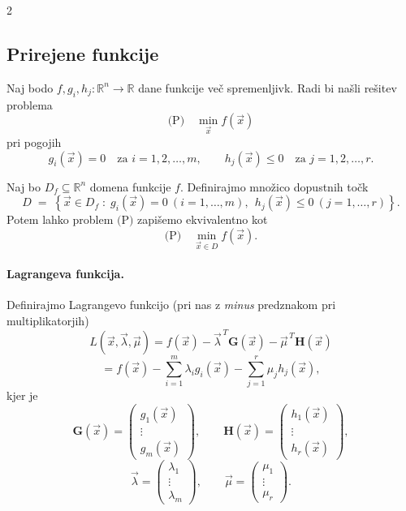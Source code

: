 \documentclass{article}
\begin{document}
\begin{multicols}{2}
	\subsection{Prirejene funkcije}

	Naj bodo \( f, g_i, h_j : \mathbb{R}^n \rightarrow \mathbb{R} \) dane funkcije več spremenljivk. Radi bi našli rešitev problema
	\[
		\text{(P)} \quad \min_{\vec{x}} f(\vec{x})
	\]
	pri pogojih
	\[
		g_i(\vec{x}) = 0 \quad \text{za } i = 1,2,\ldots,m,
		\qquad
		h_j(\vec{x}) \le 0 \quad \text{za } j = 1,2,\ldots,r.
	\]

	Naj bo \(D_f \subseteq \mathbb{R}^n\) domena funkcije \(f\). Definirajmo množico dopustnih točk
	\[
		D \;=\; \left\{\vec{x}\in D_f \;:\; g_i(\vec{x})=0 \ (i=1,\ldots,m),\ \ h_j(\vec{x})\le 0 \ (j=1,\ldots,r)\right\}.
	\]
	Potem lahko problem \(\text{(P)}\) zapišemo ekvivalentno kot
	\[
		\text{(P)} \quad \min_{\vec{x} \in D} f(\vec{x}).
	\]

	\paragraph{Lagrangeva funkcija.}
	Definirajmo Lagrangevo funkcijo (pri nas z \emph{minus} predznakom pri multiplikatorjih)
	\[
		L(\vec{x}, \vec{\lambda}, \vec{\mu})
		= f(\vec{x}) - \vec{\lambda}^{\,T}\mathbf{G}(\vec{x}) - \vec{\mu}^{\,T}\mathbf{H}(\vec{x})
	\]
	\[
		= f(\vec{x}) - \sum_{i=1}^{m} \lambda_i g_i(\vec{x}) - \sum_{j=1}^{r} \mu_j h_j(\vec{x}),
	\]
	kjer je
	\[
		\mathbf{G}(\vec{x}) =
		\begin{pmatrix}
			g_1(\vec{x}) \\
			\vdots       \\
			g_m(\vec{x})
		\end{pmatrix},
		\qquad
		\mathbf{H}(\vec{x}) =
		\begin{pmatrix}
			h_1(\vec{x}) \\
			\vdots       \\
			h_r(\vec{x})
		\end{pmatrix},
	\]
	\[
		\vec{\lambda} =
		\begin{pmatrix}
			\lambda_1 \\
			\vdots    \\
			\lambda_m
		\end{pmatrix},
		\qquad
		\vec{\mu} =
		\begin{pmatrix}
			\mu_1  \\
			\vdots \\
			\mu_r
		\end{pmatrix}.
	\]


\end{multicols}
\end{document}
